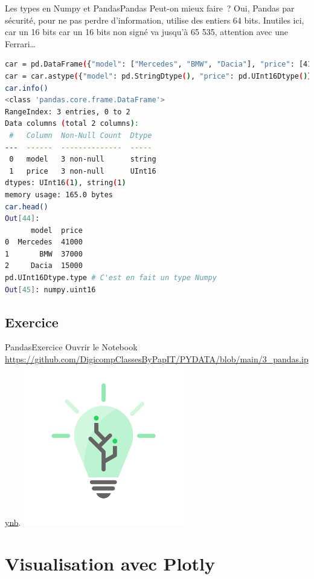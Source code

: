 \documentclass{beamer}
\begin{document}
    \begin{frame}[fragile]{Les types en Numpy et Pandas}{Pandas}
        Peut-on mieux faire~?
        \pause
        \bigbreak
        Oui, Pandas par sécurité, pour ne pas perdre d'information, utilise des entiers 64 bits.
        Inutiles ici, car un 16 bits car un 16 bits non signé va jusqu'à 65 535, attention avec une Ferrari\ldots
        \begin{lstlisting}[language=bash,basicstyle=\tiny\ttfamily]
car = pd.DataFrame({"model": ["Mercedes", "BMW", "Dacia"], "price": [41_000, 37_000, 15_000]})
car = car.astype({"model": pd.StringDtype(), "price": pd.UInt16Dtype()})
car.info()
<class 'pandas.core.frame.DataFrame'>
RangeIndex: 3 entries, 0 to 2
Data columns (total 2 columns):
 #   Column  Non-Null Count  Dtype
---  ------  --------------  -----
 0   model   3 non-null      string
 1   price   3 non-null      UInt16
dtypes: UInt16(1), string(1)
memory usage: 165.0 bytes
car.head()
Out[44]:
      model  price
0  Mercedes  41000
1       BMW  37000
2     Dacia  15000
pd.UInt16Dtype.type # C'est en fait un type Numpy
Out[45]: numpy.uint16
        \end{lstlisting}
    \end{frame}

    \subsection{Exercice}\label{pandas-exercice}
    \begin{frame}{Pandas}{Exercice \execcounterdispinc{}}
        Ouvrir le Notebook \url{https://github.com/DigicompClassesByPapIT/PYDATA/blob/main/3_pandas.ipynb}.
        \bigbreak
        \centering
        \includegraphics[width=7cm]{image/digicomp-lightbulb}
    \end{frame}


    \section{Visualisation avec Plotly}
\end{document}
